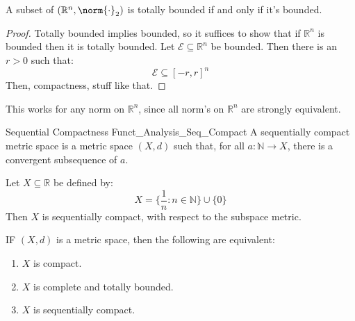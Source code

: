             \begin{theorem}
                A subset of $(\mathbb{R}^{n},\norm{\cdot}_{2})$
                is totally bounded if and only if it's bounded.
            \end{theorem}
            \begin{proof}
                Totally bounded implies bounded, so it suffices
                to show that if $\mathbb{R}^{n}$ is bounded then
                it is totally bounded. Let
                $\mathcal{E}\subseteq\mathbb{R}^{n}$ be bounded.
                Then there is an $r>0$ such that:
                \begin{equation}
                    \mathcal{E}\subseteq[-r,r]^{n}
                \end{equation}
                Then, compactness, stuff like that.
            \end{proof}
            This works for any norm on $\mathbb{R}^{n}$, since all
            norm's on $\mathbb{R}^{n}$ are strongly equivalent.
            \begin{ldefinition}{Sequential Compactness}
                  {Funct_Analysis_Seq_Compact}
                A sequentially compact metric space is a metric
                space $(X,d)$ such that, for all
                $a:\mathbb{N}\rightarrow{X}$, there is a convergent
                subsequence of $a$.
            \end{ldefinition}
            \begin{lexample}
                Let $X\subseteq\mathbb{R}$ be defined by:
                \begin{equation}
                    X=\{\frac{1}{n}:n\in\mathbb{N}\}\cup\{0\}
                \end{equation}
                Then $X$ is sequentially compact, with respect
                to the subspace metric.
            \end{lexample}
            \begin{theorem}
                IF $(X,d)$ is a metric space, then the following are
                equivalent:
                \begin{enumerate}
                    \item $X$ is compact.
                    \item $X$ is complete and totally bounded.
                    \item $X$ is sequentially compact.
                \end{enumerate}
            \end{theorem}
